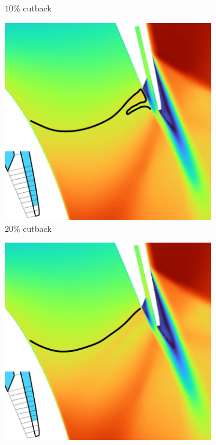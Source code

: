 \documentclass[a4paper, 11pt, oneside]{report}
\begin{document}
\begin{figure}[H]
\begin{subfigure}{.42\textwidth}
		\caption{$10\%$ cutback}
		\vspace{0.018\textheight}
	\end{subfigure}
	\begin{subfigure}{.42\textwidth}
		\centering
		\includegraphics[width=\linewidth]{figs/ss_cutbacks_m1_lines_2.png}
		\caption{$20\%$ cutback}
	\end{subfigure}
	\hspace{0.05\textwidth}
	\begin{subfigure}{.42\textwidth}
		\centering
		\includegraphics[width=\linewidth]{figs/ss_cutbacks_m1_lines_3.png}

\end{subfigure}
\end{figure}
\end{document}
